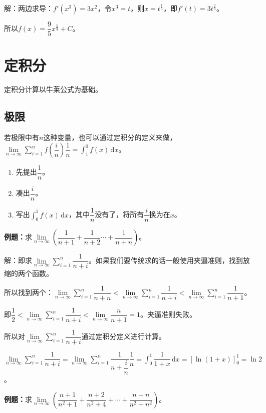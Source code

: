 \documentclass[UTF8, 12pt]{ctexart}
\begin{document}
解：两边求导：$f'(x^3)=3x^2$，令$x^3=t$，则$x=t^\frac{1}{3}$，即$f'(t)=3t^\frac{2}{3}$。

所以$f(x)=\dfrac{9}{5}x^\frac{5}{3}+C$。

\section{定积分}

定积分计算以牛莱公式为基础。

\subsection{极限}

若极限中有$n$这种变量，也可以通过定积分的定义来做，$\lim\limits_{n\to\infty}\sum\limits_{i=1}^nf\left(\dfrac{i}{n}\right)\dfrac{1}{n}=\int_1^0f(x)\,\textrm{d}x$。

\begin{enumerate}
    \item 先提出$\dfrac{1}{n}$。
    \item 凑出$\dfrac{i}{n}$。
    \item 写出$\int_0^1f(x)\,\textrm{d}x$，其中$\dfrac{1}{n}$没有了，将所有$\dfrac{i}{n}$换为在$x$。
\end{enumerate}

\textbf{例题：}求$\lim\limits_{n\to\infty}\left(\dfrac{1}{n+1}+\dfrac{1}{n+2}\cdots+\dfrac{1}{n+n}\right)$。

解：即求$\lim\limits_{n\to\infty}\sum\limits_{i=1}^n\dfrac{1}{n+i}$。如果我们要传统求的话一般使用夹逼准则，找到放缩的两个函数。

所以找到两个：$\lim\limits_{n\to\infty}\sum\limits_{i=1}^n\dfrac{1}{n+n}<\lim\limits_{n\to\infty}\sum\limits_{i=1}^n\dfrac{1}{n+i}<\lim\limits_{n\to\infty}\sum\limits_{i=1}^n\dfrac{1}{n+1}$。

即$\dfrac{1}{2}<\lim\limits_{n\to\infty}\sum\limits_{i=1}^n\dfrac{1}{n+i}<\lim\limits_{n\to\infty}\dfrac{n}{n+1}=1$。夹逼准则失败。

所以对$\lim\limits_{n\to\infty}\sum\limits_{i=1}^n\dfrac{1}{n+i}$通过定积分定义进行计算。

$\lim\limits_{n\to\infty}\sum\limits_{i=1}^n\dfrac{1}{n+i}=\lim\limits_{n\to\infty}\sum\limits_{i=1}^n\dfrac{1}{n+\dfrac{i}{n}}\dfrac{1}{n}=\displaystyle{\int_0^1\dfrac{1}{1+x}\,\textrm{d}x}=[\ln(1+x)]_0^1=\ln2$。

\textbf{例题：}求$\lim\limits_{n\to\infty}\left(\dfrac{n+1}{n^2+1}+\dfrac{n+2}{n^2+4}+\cdots+\dfrac{n+n}{n^2+n^2}\right)$。
\end{document}
